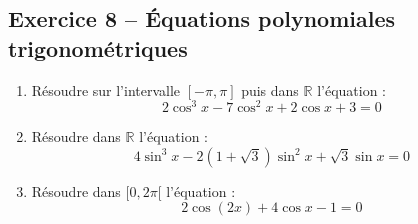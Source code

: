 \documentclass[11pt,a4paper]{article}
\newcommand{\R}{\mathbb{R}}
\begin{document}
\subsection*{Exercice 8 -- Équations polynomiales trigonométriques}

\begin{enumerate}[label=\arabic*.]
    \item Résoudre sur l'intervalle $[-\pi, \pi]$ puis dans $\R$ l'équation :
    \[
    2\cos^3 x - 7\cos^2 x + 2\cos x + 3 = 0
    \]
    \item Résoudre dans $\R$ l'équation :
    \[
    4\sin^3 x - 2(1+\sqrt{3})\sin^2 x + \sqrt{3}\sin x = 0
    \]
    \item Résoudre dans $[0, 2\pi[$ l'équation :
    \[
    2\cos(2x) + 4\cos x - 1 = 0
    \]
\end{enumerate}
\end{document}
